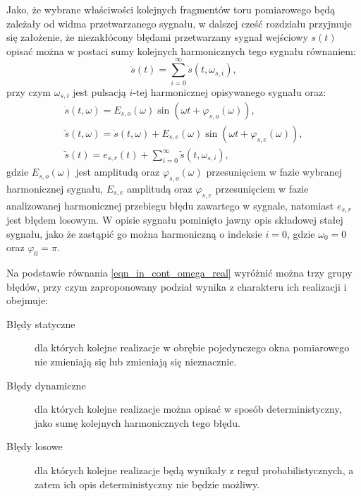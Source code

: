 Jako, że wybrane właściwości kolejnych fragmentów toru pomiarowego będą zależały od widma przetwarzanego sygnału, w dalszej cześć rozdziału przyjmuje się założenie, że niezakłócony błędami przetwarzany sygnał wejściowy $s(t)$ opisać można w postaci sumy kolejnych harmonicznych tego sygnału równaniem:
\begin{equation}
\dot{s} \left( t \right) = \sum _{i = 0} ^{\infty} \dot{s} \left( t, \omega_{s,i} \right) \label{eqn_in_cont_sum},
\end{equation}
przy czym $\omega_{s,i}$ jest pulsacją $i$-tej harmonicznej opisywanego sygnału oraz:
\begin{gather}
\dot{s} \left( t, \omega \right) = E_{s,o} \left( \omega \right) \sin \left( \omega t + \varphi_{s,o} \left( \omega \right) \right) \label{eqn_in_cont_omega_ideal}, \\
\tilde{s} \left( t, \omega \right) = \dot{s} \left( t, \omega \right) + E_{s,e} \left( \omega \right) \sin \left( \omega t + \varphi_{s,e} \left( \omega \right) \right) \label{eqn_in_cont_omega_real}, \\
\tilde{s} \left( t \right) = e_{s,r} \left( t \right) + \sum _{i = 0} ^{\infty} \tilde{s} \left( t, \omega_{s,i} \right) \label{eqn_in_cont_sum_real},
\end{gather}
gdzie $E_{s,o}(\omega)$ jest amplitudą oraz $\varphi_{s,o}(\omega)$ przesunięciem w fazie wybranej harmonicznej sygnału, $E_{s,e}$ amplitudą oraz $ \varphi_{s,e}$ przesunięciem w fazie analizowanej harmonicznej przebiegu błędu zawartego w sygnale, natomiast $e_{s,r}$ jest błędem losowym. W opisie sygnału pominięto jawny opis składowej stałej sygnału, jako że zastąpić go można harmoniczną o indeksie $i = 0$, gdzie $\omega_{0} = 0$ oraz $\varphi_{0} = \pi$.

Na podstawie równania \eqref{eqn_in_cont_omega_real} wyróżnić można trzy grupy błędów, przy czym zaproponowany podział wynika z charakteru ich realizacji i obejmuje:
\begin{description}
\item [Błędy statyczne] dla których kolejne realizacje w obrębie pojedynczego okna pomiarowego nie zmieniają się lub zmieniają się nieznacznie.
\item [Błędy dynamiczne] dla których kolejne realizacje można opisać w sposób deterministyczny, jako sumę kolejnych harmonicznych tego błędu.
\item [Błędy losowe] dla których kolejne realizacje będą wynikały z reguł probabilistycznych, a zatem ich opis deterministyczny nie będzie możliwy.
\end{description}


